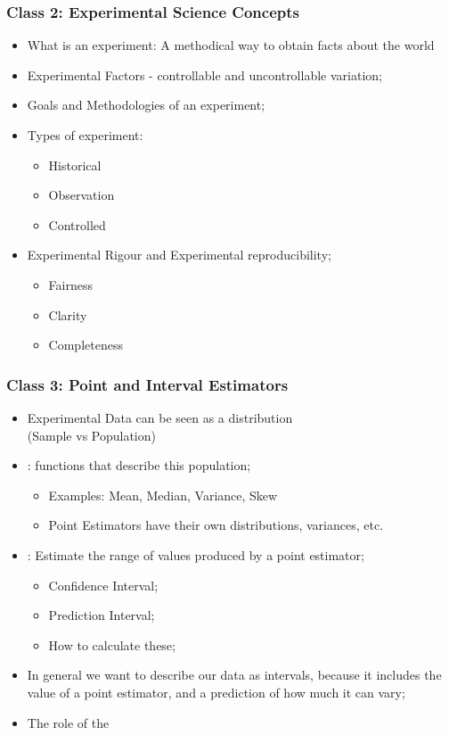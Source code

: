 \documentclass[10pt]{beamer}
\begin{document}
\begin{frame}
  \frametitle{Class 2: Experimental Science Concepts}
  \begin{itemize}
  \item What is an experiment: A methodical way to obtain facts about
    the world
  \item Experimental Factors - controllable and uncontrollable
    variation;
  \item Goals and Methodologies of an experiment;
  \item Types of experiment:
    \begin{itemize}
      \item Historical
      \item Observation
      \item Controlled
    \end{itemize}
  \item Experimental Rigour and Experimental reproducibility;
    \begin{itemize}
    \item Fairness
    \item Clarity
    \item Completeness
    \end{itemize}
  \end{itemize}
\end{frame}

\begin{frame}
  \frametitle{Class 3: Point and Interval Estimators}
  \begin{itemize}
  \item Experimental Data can be seen as a distribution\\
    (Sample vs Population)
  \item {}: functions that describe this
    population;
    \begin{itemize}
    \item Examples: Mean, Median, Variance, Skew
    \item Point Estimators have their own distributions, variances, etc.
    \end{itemize}
  \item {}: Estimate the range of values
    produced by a point estimator;
    \begin{itemize}
    \item Confidence Interval;
    \item Prediction Interval;
    \item How to calculate these;
    \end{itemize}
  \item In general we want to describe our data as intervals, because
    it includes the value of a point estimator, and a prediction of
    how much it can vary;
  \item The role of the 
  \end{itemize}
\end{frame}
\end{document}
